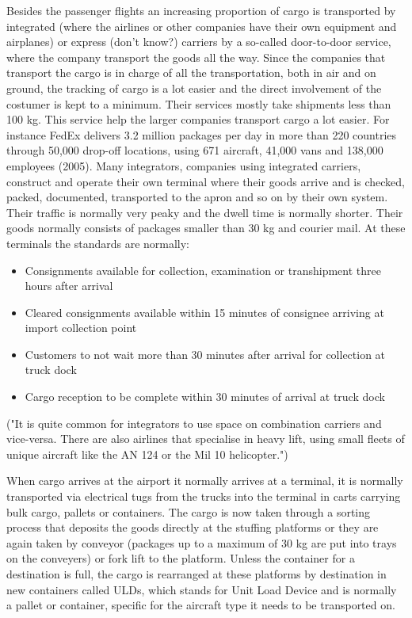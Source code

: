 Besides the passenger flights an increasing proportion of cargo is transported by integrated (where the airlines or other companies have their own equipment and airplanes) or express (don't know?) %
carriers by a so-called door-to-door service, where the company transport the goods all the way. Since the companies that transport the cargo is in charge of all the transportation, both in air and on ground, the tracking of cargo is a lot easier and the direct involvement of the costumer is kept to a minimum. Their services mostly take shipments less than 100 kg. This service help the larger companies transport cargo a lot easier. For instance FedEx delivers 3.2 million packages per day in more than 220 countries through 50,000 drop-off locations, using 671 aircraft, 41,000 vans and 138,000 employees (2005). %
Many integrators, companies using integrated carriers, construct and operate their own terminal where their goods arrive and is checked, packed, documented, transported to the apron and so on by their own system. 
Their traffic is normally very peaky and the dwell time is normally shorter. Their goods normally consists of packages smaller than 30 kg and courier mail. At these terminals the standards are normally:
\begin{itemize}
\item Consignments available for collection, examination or transhipment %
three hours after arrival
\item Cleared consignments available within 15 minutes of consignee arriving at import collection point
\item Customers to not wait more than 30 minutes after arrival for collection at truck dock
\item Cargo reception to be complete within 30 minutes of arrival at truck dock
\end{itemize}

("It is quite common for integrators to use space on combination carriers and vice-versa. There are also airlines that specialise in heavy lift, using small fleets of unique aircraft like the AN 124 or the Mil 10 helicopter.") %


When cargo arrives at the airport it normally arrives at a terminal, it is normally transported via electrical tugs from the trucks into the terminal in carts carrying bulk cargo, pallets or containers. The cargo is now taken through a sorting process that deposits the goods directly at the stuffing platforms or they are again taken by conveyor (packages up to a maximum of 30 kg are put into trays on the conveyers) or fork lift to the platform.
Unless the container for a destination is full, the cargo is rearranged at these platforms by destination in new containers called ULDs, which stands for Unit Load Device and is normally a pallet or container, specific for the aircraft type it needs to be transported on.


